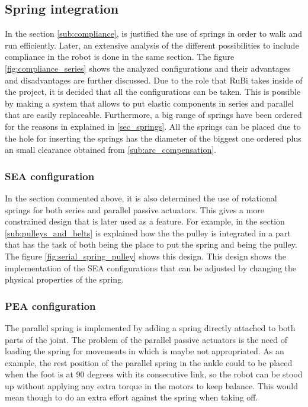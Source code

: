 \subsection{Spring integration} %
\label{sub:spring_integration}
In the section \ref{sub:compliance}, is justified the use of springs in order to walk and run efficiently. 
Later, an extensive analysis of the different possibilities to include compliance in the robot is done in the same section.
The figure \ref{fig:compliance_series} shows the analyzed configurations and their advantages and disadvantages are further discussed.
Due to the role that RuBi takes inside of the project, it is decided that all the configurations can be taken.
This is possible by making a system that allows to put elastic components in series and parallel that are easily replaceable.
Furthermore, a big range of springs have been ordered for the reasons in explained in \ref{sec_springs}.
All the springs can be placed due to the hole for inserting the springs has the diameter of the biggest one ordered plus an small clearance obtained from \ref{sub:arc_compensation}.

\subsubsection{SEA configuration} %
\label{ssub:sea_configuration}

In the section commented above, it is also determined the use of rotational springs for both series and parallel passive actuators.
This gives a more constrained design that is later used as a feature.
For example, in the section \ref{sub:pulleys_and_belts} is explained how the the pulley is integrated in a part that has the task of both being the place to put the spring and being the pulley.
The figure \ref{fig:serial_spring_pulley} shows this design.
This design shows the implementation of the SEA configurations that can be adjusted by changing the physical properties of the spring.

\subsubsection{PEA configuration} %
\label{ssub:pea_configuration}

The parallel spring is implemented by adding a spring directly attached to both parts of the joint.
The problem of the parallel passive actuators is the need of loading the spring for movements in which is maybe not appropriated.
As an example, the rest position of the parallel spring in the ankle could to be placed when the foot is at 90 degrees with its consecutive link, so the robot can be stood up without applying any extra torque in the motors to keep balance.
This would mean though to do an extra effort against the spring when taking off.

